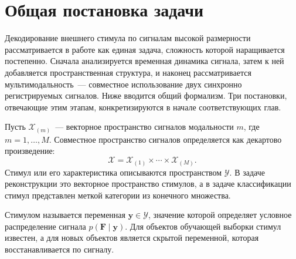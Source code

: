 \section{Общая постановка задачи}\label{sec2}\label{sec2:general}

Декодирование внешнего стимула по сигналам высокой размерности рассматривается в работе как единая задача, сложность которой наращивается постепенно. Сначала анализируется временная динамика сигнала, затем к ней добавляется пространственная структура, и наконец рассматривается мультимодальность~--- совместное использование двух синхронно регистрируемых сигналов. Ниже вводится общий формализм. Три постановки, отвечающие этим этапам, конкретизируются в начале соответствующих глав.

Пусть $\mathcal{X}_{(m)}$~--- векторное пространство сигналов модальности $m$, где $m = 1, \ldots, M$. Совместное пространство сигналов определяется как декартово произведение:
\begin{equation*}\mathcal{X} = \mathcal{X}_{(1)} \times \cdots \times \mathcal{X}_{(M)}.
\end{equation*}
Стимул или его характеристика описываются пространством $\mathcal{Y}$. В задаче реконструкции это векторное пространство стимулов, а в задаче классификации стимул представлен меткой категории из конечного множества.

\begin{definition}\label{def:stimulus}
Стимулом называется переменная $\mathbf{y} \in \mathcal{Y}$, значение которой определяет условное распределение сигнала $p(\mathbf{F} \mid \mathbf{y})$. Для объектов обучающей выборки стимул известен, а для новых объектов является скрытой переменной, которая восстанавливается по сигналу.
\end{definition}

